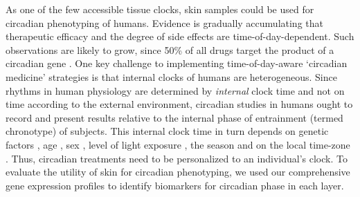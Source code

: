As one of the few accessible tissue clocks, skin samples could be used for circadian phenotyping of humans. Evidence is gradually accumulating that therapeutic efficacy and the degree of side effects are time-of-day-dependent\cite{Montaigne2018,Dallmann2016,Long2016}. Such observations are likely to grow, since 50\% of all drugs target the product of a circadian gene \cite{Ruben2018, Zhang2014}. One key challenge to implementing time-of-day-aware `circadian medicine' strategies is that internal clocks of humans are heterogeneous. Since rhythms in human physiology are determined by \textit{internal} clock time and not on time according to the external environment, circadian studies in humans ought to record and present results relative to the internal phase of entrainment (termed chronotype) of subjects. This internal clock time in turn depends on genetic factors \cite{Hsu2015, Brown2008}, age \cite{Roenneberg2007}, sex \cite{Roenneberg2007}, level of light exposure \cite{Stothard2017, Wright2013}, the season \cite{Stothard2017, Allebrandt2014} and on the local time-zone \cite{Roenneberg2007}. Thus, circadian treatments need to be personalized to an individual's clock.  To evaluate the utility of skin for circadian phenotyping, we used our comprehensive gene expression profiles to identify biomarkers for circadian phase in each layer. %



